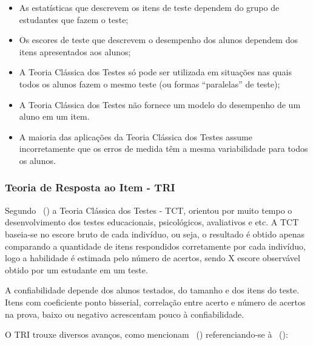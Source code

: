 \documentclass[
	article,			%
	11pt,				%
	oneside,			%
	a4paper,			%
	english,			%
	brazil,				%
	sumario=tradicional
]{abntex2}
\newcommand{\citeaa}[1]{\citeauthoronline{#1}~(\citeyear{#1})}
\begin{document}
				\begin{itemize}
					\item As estatísticas que descrevem os itens de teste dependem do grupo de estudantes
					que fazem o teste;
					
					\item Os escores de teste que descrevem o desempenho dos alunos dependem dos itens
					apresentados aos alunos;
					
					\item A Teoria Clássica dos Testes só pode ser utilizada em situações nas quais todos os
					alunos fazem o mesmo teste (ou formas “paralelas” de teste);
					
					\item A Teoria Clássica dos Testes não fornece um modelo do desempenho de um aluno
					em um item.
					
					\item A maioria das aplicações da Teoria Clássica dos Testes assume incorretamente que
					os erros de medida têm a mesma variabilidade para todos os alunos.
					
					
				\end{itemize}

			\subsubsection{Teoria de Resposta ao Item - TRI}

				Segundo \citeaa{Klein2013} a Teoria Clássica dos Testes - TCT, orientou por
				muito tempo o desenvolvimento dos testes educacionais, psicológicos, avaliativos e etc. A
				TCT baseia-se no escore bruto de cada indivíduo, ou seja, o resultado é obtido apenas
				comparando a quantidade de itens respondidos corretamente por cada indivíduo, logo a
				habilidade é estimada pelo número de acertos, sendo X escore observável obtido por um
				estudante em um teste.
				
				A confiabilidade depende dos alunos testados, do tamanho e dos itens do teste.
				Itens com coeficiente ponto bisserial, correlação entre acerto e número de acertos na prova,
				baixo ou negativo acrescentam pouco à confiabilidade.	
				
				O TRI trouxe diversos avanços, como mencionam \citeaa{Pasquali2018} \nocite{PASQUALI2003} referenciando-se à \citeaa{Hambleton1991}:
				
\end{document}
